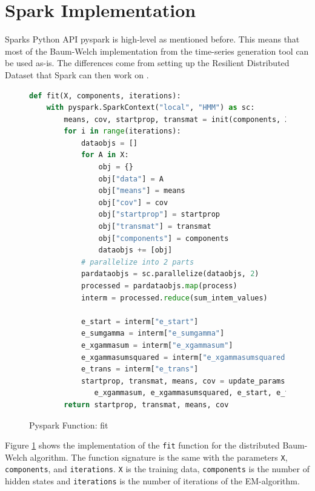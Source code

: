 \section{Spark Implementation}

Sparks Python API pyspark is high-level as mentioned before. This means that most of the Baum-Welch implementation from the time-series generation tool can be used as-is. The differences come from setting up the Resilient Distributed Dataset that Spark can then work on \parencite{sparkhmm}.

\begin{figure}
\begin{singlespace}
\begin{lstlisting}[language=Python]
def fit(X, components, iterations):
    with pyspark.SparkContext("local", "HMM") as sc:
        means, cov, startprop, transmat = init(components, X)
        for i in range(iterations):
            dataobjs = []
            for A in X:
                obj = {}
                obj["data"] = A
                obj["means"] = means
                obj["cov"] = cov
                obj["startprop"] = startprop
                obj["transmat"] = transmat
                obj["components"] = components
                dataobjs += [obj]
            # parallelize into 2 parts
            pardataobjs = sc.parallelize(dataobjs, 2)
            processed = pardataobjs.map(process)
            interm = processed.reduce(sum_intem_values)

            e_start = interm["e_start"]
            e_sumgamma = interm["e_sumgamma"]
            e_xgammasum = interm["e_xgammasum"]
            e_xgammasumsquared = interm["e_xgammasumsquared"]
            e_trans = interm["e_trans"]
            startprop, transmat, means, cov = update_params(e_sumgamma, \
               e_xgammasum, e_xgammasumsquared, e_start, e_trans)
        return startprop, transmat, means, cov
\end{lstlisting}
\end{singlespace}
\caption{Pyspark Function: fit}    
\label{fig:pyspark-fit-listing}
\end{figure}

Figure \ref{fig:pyspark-fit-listing} shows the implementation of the \texttt{fit} function for the distributed Baum-Welch algorithm. The function signature is the same with the parameters \texttt{X}, \texttt{components}, and \texttt{iterations}. \texttt{X} is the training data, \texttt{components} is the number of hidden states and \texttt{iterations} is the number of iterations of the EM-algorithm. 

